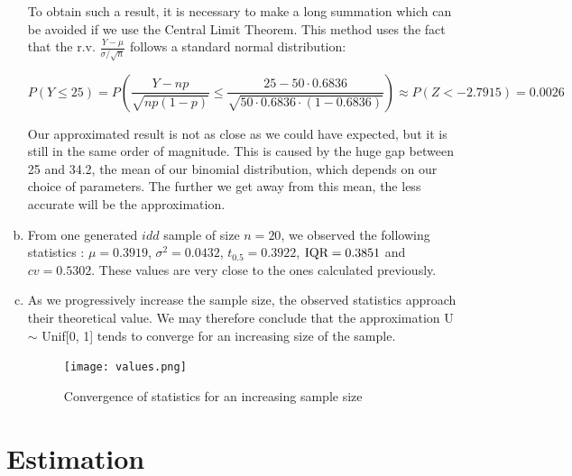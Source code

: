 \documentclass[a4paper]{article}
\begin{document}
\begin{enumerate}[(a)]
To obtain such a result, it is necessary to make a long summation which can be avoided if we use the Central Limit Theorem. This method uses the fact that the r.v. $\frac{Y-\mu}{\sigma / \sqrt{n}}$ follows a standard normal distribution:

$$P(Y \leq 25) = P\left ( \frac{Y-np}{\sqrt{np(1-p)}} \leq \frac{25-50\cdot0.6836}{\sqrt{50\cdot0.6836\cdot(1-0.6836)}} \right ) \approx P(Z < -2.7915) = 0.0026$$

Our approximated result is not as close as we could have expected, but it is still in the same order of magnitude. This is caused by the huge gap between 25 and 34.2, the mean of our binomial distribution, which depends on our choice of parameters. The further we get away from this mean, the less accurate will be the approximation.

\item From one generated $idd$ sample of size $n = 20$, we observed the following statistics : $\mu = 0.3919$, $\sigma^2 = 0.0432$, $t_0.5 = 0.3922$, $\textup{IQR} = 0.3851$ and $cv = 0.5302$.
These values are very close to the ones calculated previously.

\item As we progressively increase the sample size, the observed statistics approach their theoretical value. We may therefore conclude that the approximation U $\sim$ Unif[0, 1] tends to converge for an increasing size of the sample.

\begin{figure}
    \centering
  \texttt{[image: values.png]}
  \caption{Convergence of statistics for an increasing sample size}
\end{figure}

\end{enumerate}


\newpage

\section{Estimation}
\end{document}
